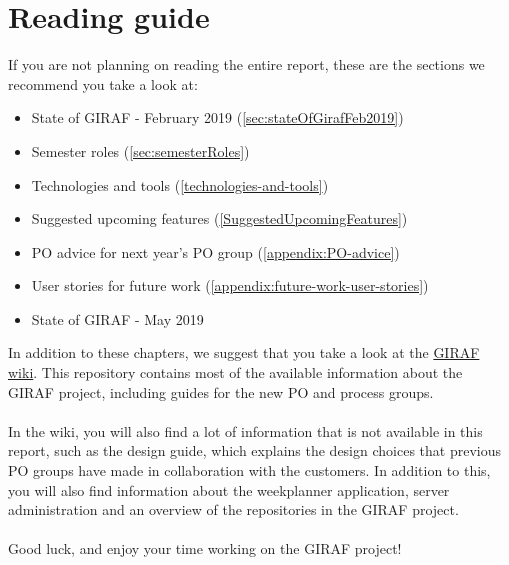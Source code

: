 \chapter*{Reading guide}
If you are not planning on reading the entire report, these are the sections we recommend you take a look at:

\begin{itemize}
    \item State of GIRAF - February 2019 (\autoref{sec:stateOfGirafFeb2019})
    \item Semester roles (\autoref{sec:semesterRoles})
    \item Technologies and tools (\autoref{technologies-and-tools})
    \item Suggested upcoming features (\autoref{SuggestedUpcomingFeatures})
    \item PO advice for next year's PO group (\autoref{appendix:PO-advice})
    \item User stories for future work (\autoref{appendix:future-work-user-stories})
    \item State of GIRAF - May 2019
\end{itemize}
\noindent
In addition to these chapters, we suggest that you take a look at the \href{https://github.com/aau-giraf/wiki}{GIRAF wiki}.
This repository contains most of the available information about the GIRAF project, including guides for the new PO and process groups.
\\\\
In the wiki, you will also find a lot of information that is not available in this report, such as the design guide, which explains the design choices that previous PO groups have made in collaboration with the customers.
In addition to this, you will also find information about the weekplanner application, server administration and an overview of the repositories in the GIRAF project.
\\\\
Good luck, and enjoy your time working on the GIRAF project!
